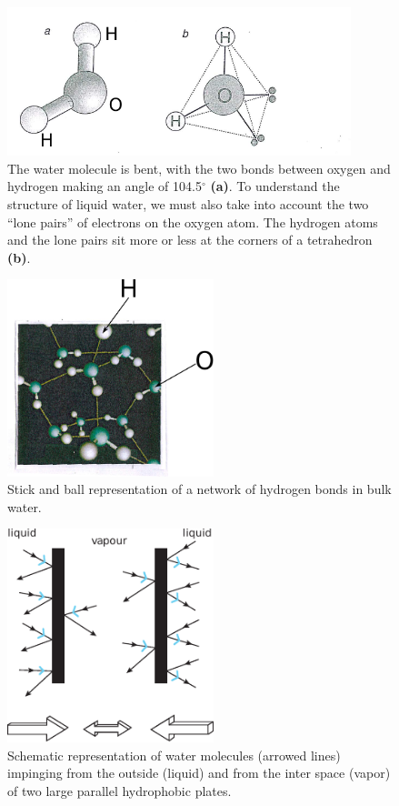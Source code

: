 \begin{subappendices}
\begin{figure}
\end{figure}
\begin{figure}
\centerline{\includegraphics[width=10cm]{C8/figsC8/fig6G6.pdf}}
\caption{The water molecule is bent, with the two bonds between oxygen and hydrogen making an angle of 104.5$^\circ$ \textbf{(a)}. To understand the structure of liquid water, we must also take into account the two ``lone pairs'' of electrons on the oxygen atom. The hydrogen atoms and the lone pairs sit more or less at the corners of a tetrahedron \textbf{(b)}.}\label{fig6G6}
\end{figure}
\begin{figure}
\centerline{\includegraphics[width=6cm]{C8/figsC8/fig6G7.pdf}}
\caption{Stick and ball representation  of a network of hydrogen bonds in bulk water. }\label{fig6G7}
\end{figure}
\begin{figure}
\centerline{\includegraphics[width=6cm]{C8/figsC8/fig6G8.pdf}}
\caption{Schematic representation of water molecules (arrowed lines) impinging from the outside (liquid) and from the inter space (vapor) of two large parallel hydrophobic plates.}\label{fig6G8}
\end{figure}



\end{subappendices}
